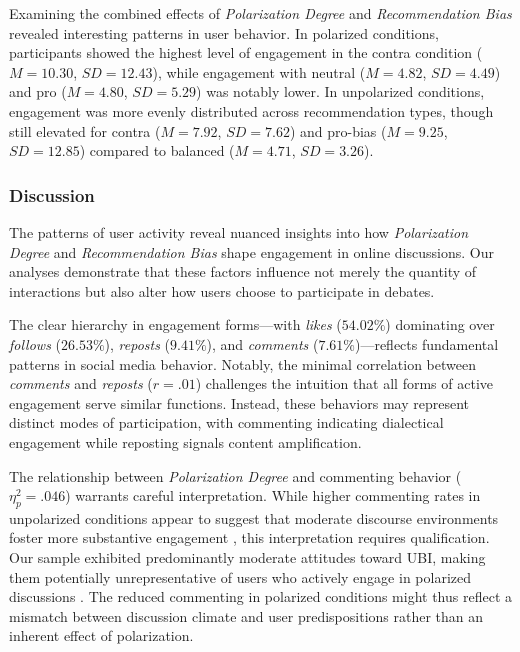 Examining the combined effects of \emph{Polarization Degree} and \emph{Recommendation Bias} revealed interesting patterns in user behavior. In polarized conditions, participants showed the highest level of engagement in the contra condition ($M = 10.30$, $SD = 12.43$), while engagement with neutral ($M = 4.82$, $SD = 4.49$) and pro ($M = 4.80$, $SD = 5.29$) was notably lower. In unpolarized conditions, engagement was more evenly distributed across recommendation types, though still elevated for contra ($M = 7.92$, $SD = 7.62$) and pro-bias ($M = 9.25$, $SD = 12.85$) compared to balanced ($M = 4.71$, $SD = 3.26$).

\subsubsection{Discussion}

The patterns of user activity reveal nuanced insights into how \emph{Polarization Degree} and \emph{Recommendation Bias} shape engagement in online discussions. Our analyses demonstrate that these factors influence not merely the quantity of interactions but also alter how users choose to participate in debates.

The clear hierarchy in engagement forms---with \emph{likes} ($54.02\%$) dominating over \emph{follows} ($26.53\%$), \emph{reposts} ($9.41\%$), and \emph{comments} ($7.61\%$)---reflects fundamental patterns in social media behavior. Notably, the minimal correlation between \emph{comments} and \emph{reposts} ($r = .01$) challenges the intuition that all forms of active engagement serve similar functions. Instead, these behaviors may represent distinct modes of participation, with commenting indicating dialectical engagement while reposting signals content amplification.

The relationship between \emph{Polarization Degree} and commenting behavior ($\eta^2_p = .046$) warrants careful interpretation. While higher commenting rates in unpolarized conditions appear to suggest that moderate discourse environments foster more substantive engagement \citep{koudenburg_polarized_2022, yousafzai_political_2022}, this interpretation requires qualification. Our sample exhibited predominantly moderate attitudes toward UBI, making them potentially unrepresentative of users who actively engage in polarized discussions \citep{simchon_troll_2022}. The reduced commenting in polarized conditions might thus reflect a mismatch between discussion climate and user predispositions rather than an inherent effect of polarization.

